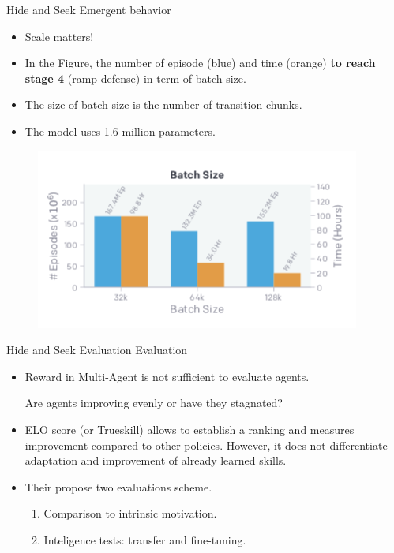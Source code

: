 \documentclass{beamer}
\begin{document}
\begin{frame}{Hide and Seek Emergent behavior}
    \begin{itemize}
        \item Scale matters!
        \item In the Figure, the number of episode (blue) and time (orange) \textbf{to reach stage 4 }(ramp defense) in term of batch size.
        \item The size of batch size is the number of transition chunks.
        \item The model uses 1.6 million parameters.
    \end{itemize}{}
     
         \begin{figure}
        \centering
        \includegraphics[scale=0.6]{Figure4.png}
    \end{figure}{}
\end{frame}{}

\begin{frame}{Hide and Seek Evaluation}
Evaluation
\vfill
    \begin{itemize}
        \item Reward in Multi-Agent is not sufficient to evaluate agents.
        
        Are agents improving evenly or have they stagnated?
        \vfill
        \item ELO score (or Trueskill) allows to establish a ranking and measures improvement compared to other policies. However, it does not differentiate adaptation and improvement of already learned skills.
        \vfill
        \item Their propose two evaluations scheme.
        \vfill
        \begin{enumerate}
            \item Comparison to intrinsic motivation.
            \vfill
            \item Inteligence tests: transfer and fine-tuning.
            \vfill
        \end{enumerate}{}
    \end{itemize}{}
\end{frame}{}
\end{document}
